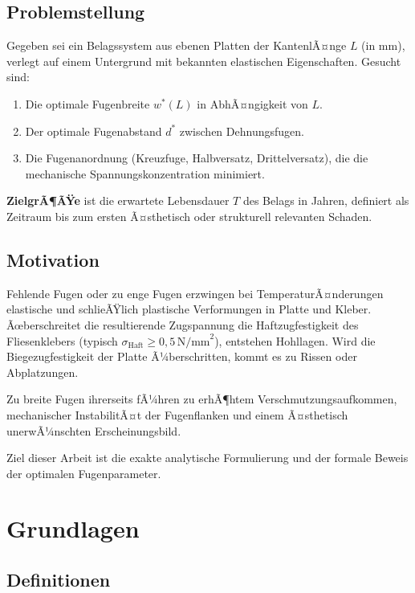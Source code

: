 ﻿\documentclass[a4paper,12pt]{article}
\theoremstyle{definition}
\begin{document}
\subsection{Problemstellung}

Gegeben sei ein Belagssystem aus ebenen Platten der KantenlÃ¤nge $L$
(in mm), verlegt auf einem Untergrund mit bekannten elastischen
Eigenschaften. Gesucht sind:
\begin{enumerate}
	\item Die optimale Fugenbreite $w^*(L)$ in AbhÃ¤ngigkeit von $L$.
	\item Der optimale Fugenabstand $d^*$ zwischen Dehnungsfugen.
	\item Die Fugenanordnung (Kreuzfuge, Halbversatz, Drittelversatz),
	      die die mechanische Spannungskonzentration minimiert.
\end{enumerate}

\textbf{ZielgrÃ¶ÃŸe} ist die erwartete Lebensdauer $T$ des Belags in Jahren,
definiert als Zeitraum bis zum ersten Ã¤sthetisch oder strukturell
relevanten Schaden.

\subsection{Motivation}

Fehlende Fugen oder zu enge Fugen erzwingen bei TemperaturÃ¤nderungen
elastische und schlieÃŸlich plastische Verformungen in Platte und Kleber.
Ãœberschreitet die resultierende Zugspannung die Haftzugfestigkeit
des Fliesenklebers (typisch $\sigma_{\text{Haft}} \geq 0{,}5\,\text{N/mm}^2$),
entstehen Hohllagen. Wird die Biegezugfestigkeit der Platte Ã¼berschritten,
kommt es zu Rissen oder Abplatzungen.

Zu breite Fugen ihrerseits fÃ¼hren zu erhÃ¶htem Verschmutzungsaufkommen,
mechanischer InstabilitÃ¤t der Fugenflanken und einem Ã¤sthetisch
unerwÃ¼nschten Erscheinungsbild.

Ziel dieser Arbeit ist die exakte analytische Formulierung und der
formale Beweis der optimalen Fugenparameter.

\section{Grundlagen}

\subsection{Definitionen}
\end{document}
